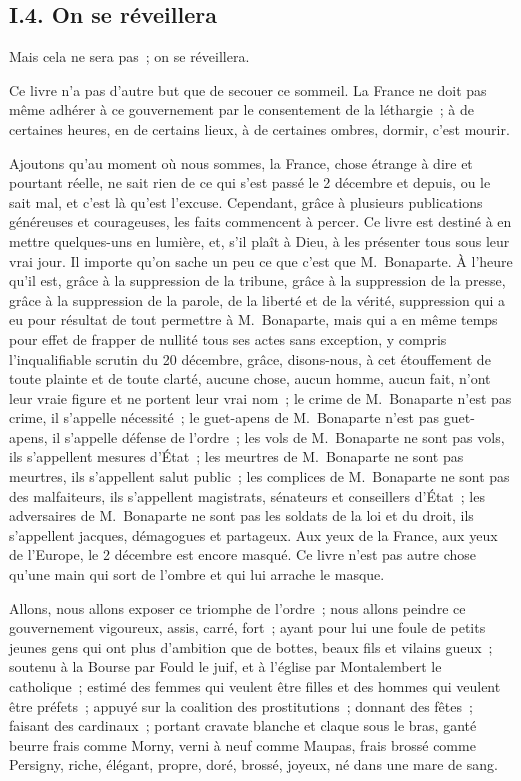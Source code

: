 \documentclass[french,twoside]{book} %
\begin{document}
\subsection[{I.4. On se réveillera}]{I.4. On se réveillera}
\noindent Mais cela ne sera pas ; on se réveillera.\par
Ce livre n’a pas d’autre but que de secouer ce sommeil. La France ne doit pas même adhérer à ce gouvernement par le consentement de la léthargie ; à de certaines heures, en de certains lieux, à de certaines ombres, dormir, c’est mourir.\par
Ajoutons qu’au moment où nous sommes, la France, chose étrange à dire et pourtant réelle, ne sait rien de ce qui s’est passé le 2 décembre et depuis, ou le sait mal, et c’est là qu’est l’excuse. Cependant, grâce à plusieurs publications généreuses et courageuses, les faits commencent à percer. Ce livre est destiné à en mettre quelques-uns en lumière, et, s’il plaît à Dieu, à les présenter tous sous leur vrai jour. Il importe qu’on sache un peu ce que c’est que M. Bonaparte. À l’heure qu’il est, grâce à la suppression de la tribune, grâce à la suppression de la presse, grâce à la suppression de la parole, de la liberté et de la vérité, suppression qui a eu pour résultat de tout permettre à M. Bonaparte, mais qui a en même temps pour effet de frapper de nullité tous ses actes sans exception, y compris l’inqualifiable scrutin du 20 décembre, grâce, disons-nous, à cet étouffement de toute plainte et de toute clarté, aucune chose, aucun homme, aucun fait, n’ont leur vraie figure et ne portent leur vrai nom ; le crime de M. Bonaparte n’est pas crime, il s’appelle nécessité ; le guet-apens de M. Bonaparte n’est pas guet-apens, il s’appelle défense de l’ordre ; les vols de M. Bonaparte ne sont pas vols, ils s’appellent mesures d’État ; les meurtres de M. Bonaparte ne sont pas meurtres, ils s’appellent salut public ; les complices de M. Bonaparte ne sont pas des malfaiteurs, ils s’appellent magistrats, sénateurs et conseillers d’État ; les adversaires de M. Bonaparte ne sont pas les soldats de la loi et du droit, ils s’appellent jacques, démagogues et partageux. Aux yeux de la France, aux yeux de l’Europe, le 2 décembre est encore masqué. Ce livre n’est pas autre chose qu’une main qui sort de l’ombre et qui lui arrache le masque.\par
Allons, nous allons exposer ce triomphe de l’ordre ; nous allons peindre ce gouvernement vigoureux, assis, carré, fort ; ayant pour lui une foule de petits jeunes gens qui ont plus d’ambition que de bottes, beaux fils et vilains gueux ; soutenu à la Bourse par Fould le juif, et à l’église par Montalembert le catholique ; estimé des femmes qui veulent être filles et des hommes qui veulent être préfets ; appuyé sur la coalition des prostitutions ; donnant des fêtes ; faisant des cardinaux ; portant cravate blanche et claque sous le bras, ganté beurre frais comme Morny, verni à neuf comme Maupas, frais brossé comme Persigny, riche, élégant, propre, doré, brossé, joyeux, né dans une mare de sang.\par
\end{document}
